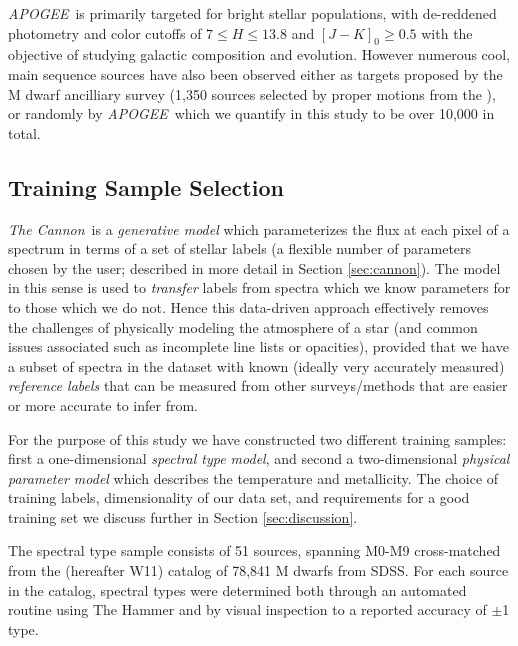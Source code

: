 \documentclass[modern]{aastex62}
\newcommand{\apogee}{\textsl{APOGEE}}
\newcommand{\thecannon}{\textsl{The Cannon}}
\begin{document}
\apogee\ is primarily targeted for bright stellar populations, with de-reddened photometry and color cutoffs of $7 \leq H \leq 13.8$ and $[J-K]_0 \geq 0.5$ \citep{Zasowski:2013} with the objective of studying galactic composition and evolution. However numerous cool, main sequence sources have also been observed either as targets proposed by the M dwarf ancilliary survey (1,350 sources selected by proper motions from the  \citealt{Desphande:2013}), or randomly by \apogee\, which we quantify in this study to be over 10,000 in total.


\subsection{Training Sample Selection}

\thecannon\ is a \emph{generative model} which parameterizes the flux at each pixel of a spectrum in terms of a set of stellar labels (a flexible number of parameters chosen by the user; described in more detail in Section \ref{sec:cannon}). The model in this sense is used to \emph{transfer} labels from spectra which we know parameters for to those which we do not. Hence this data-driven approach effectively removes the challenges of physically modeling the atmosphere of a star (and common issues associated such as incomplete line lists or opacities), provided that we have a subset of spectra in the dataset with known (ideally very accurately measured) \emph{reference labels} that can be measured from other surveys/methods that are easier or more accurate to infer from. 

For the purpose of this study we have constructed two different training samples: first a one-dimensional \emph{spectral type model}, and second a two-dimensional \emph{physical parameter model} which describes the temperature and metallicity. The choice of training labels, dimensionality of our data set, and requirements for a good training set we discuss further in Section \ref{sec:discussion}.

The spectral type sample consists of 51 sources, spanning M0-M9 cross-matched from the \citealt{West:2011} (hereafter W11) catalog of 78,841 M dwarfs from SDSS. For each source in the catalog, spectral types were determined both through an automated routine using The Hammer \citep{Covey:2007} and by visual inspection to a reported accuracy of $\pm$1 type.
\end{document}
